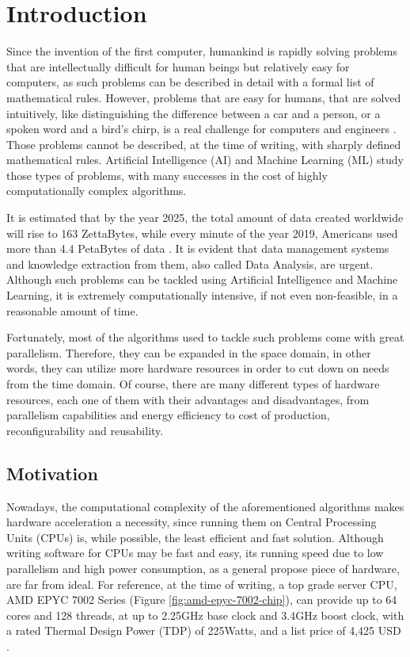 \chapter{Introduction}

\label{Chapter-Introduction}

Since the invention of the first computer, humankind is rapidly solving problems that are intellectually difficult for human beings but relatively easy for computers, as such problems can be described in detail with a formal list of mathematical rules. However, problems that are easy for humans, that are solved intuitively, like distinguishing the difference between a car and a person, or a spoken word and a bird's chirp, is a real challenge for computers and engineers \cite{Goodfellow-et-al-2016}. Those problems cannot be described, at the time of writing, with sharply defined mathematical rules. Artificial Intelligence (AI) and Machine Learning (ML) study those types of problems, with many successes in the cost of highly computationally complex algorithms.

It is estimated that by the year 2025, the total amount of data created worldwide will rise to 163 ZettaBytes, while every minute of the year 2019, Americans used more than 4.4 PetaBytes of data \cite{Forbes-How-Much-Data-Is-Collected-Every-Minute-Of-The-Day}. It is evident that data management systems and knowledge extraction from them, also called Data Analysis, are urgent. Although such problems can be tackled using Artificial Intelligence and Machine Learning, it is extremely computationally intensive, if not even non-feasible, in a reasonable amount of time.

Fortunately, most of the algorithms used to tackle such problems come with great parallelism. Therefore, they can be expanded in the space domain, in other words, they can utilize more hardware resources in order to cut down on needs from the time domain. Of course, there are many different types of hardware resources, each one of them with their advantages and disadvantages, from parallelism capabilities and energy efficiency to cost of production, reconfigurability and reusability.

\section{Motivation}

Nowadays, the computational complexity of the aforementioned algorithms makes hardware acceleration a necessity, since running them on Central Processing Units (CPUs) is, while possible, the least efficient and fast solution. Although writing software for CPUs may be fast and easy, its running speed due to low parallelism and high power consumption, as a general propose piece of hardware, are far from ideal. For reference, at the time of writing, a top grade server CPU, AMD EPYC 7002 Series (Figure \ref{fig:amd-epyc-7002-chip}), can provide up to 64 cores and 128 threads, at up to 2.25GHz base clock and 3.4GHz boost clock, with a rated Thermal Design Power (TDP) of 225Watts, and a list price of 4,425 USD \cite{AMD-EPYC-7002-Series-Processors}.

